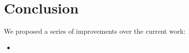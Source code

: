 \section{Conclusion}


% 


We proposed a series of improvements over the current work:
\begin{itemize}
    \item 
\end{itemize}
